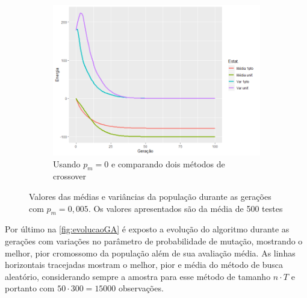 \begin{figure}[h!]
\begin{subfigure}[b]{0.67\linewidth}
		\includegraphics[width=\linewidth]{imagens/comp_cross_1pto_unif.png}
		\caption{Usando \(p_m = 0\) e comparando dois métodos de crossover}
	\end{subfigure}
\caption{Valores das médias e variâncias da população durante as gerações com \(p_m=0,005\). Os valores apresentados são da média de 500 testes}
	\label{fig:distribuicao_ising_geracoes}
\end{figure}

Por último na \autoref{fig:evolucaoGA} é exposto a evolução do algoritmo durante as gerações com variações no parâmetro de probabilidade de mutação, mostrando o melhor, pior cromossomo da população além de sua avaliação média. As linhas horizontais tracejadas mostram o melhor, pior e média do método de busca aleatório, considerando sempre a amostra para esse método de tamanho \(n \cdot T\) e portanto com \(50 \cdot 300 = 15000\) observações.

